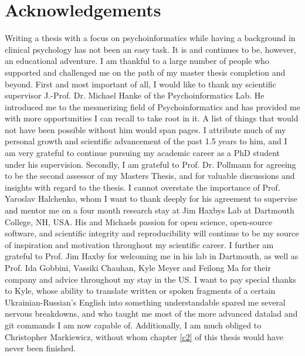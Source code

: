 \documentclass[a4paper, 12pt]{scrreprt}
\begin{document}
\clearpage



\chapter*{Acknowledgements}

	{\scriptsize Writing a thesis with a focus on psychoinformatics while having a background in clinical psychology has not been an easy task. It is and continues to be, however, an educational adventure. I am thankful to a large number of people who supported and challenged me on the path of my master thesis completion and beyond. First and most important of all, I would like to thank my scientific supervisor J.-Prof. Dr. Michael Hanke of the Psychoinformatics Lab. He introduced me to the mesmerizing field of Psychoinformatics and has provided me with more opportunities I can recall to take root in it. A list of things that would not have been possible without him would span pages. I attribute much of my personal growth and scientific advancement of the past 1.5 years to him, and I am very grateful to continue pursuing my academic career as a PhD student under his supervision.
	Secondly, I am grateful to Prof. Dr. Pollmann for agreeing to be the second assessor of my Masters Thesis, and for valuable discussions and insights with regard to the thesis.\newline
	I cannot overstate the importance of Prof. Yaroslav Halchenko, whom I want to thank deeply for his agreement to supervise and mentor me on a four month research stay at Jim Haxbys Lab at Dartmouth College, NH, USA. His and Michaels passion for open science, open-source software, and scientific integrity and reproducibility will continue to be my source of inspiration and motivation throughout my scientific career.
	I further am grateful to Prof. Jim Haxby for welcoming me in his lab in Dartmouth, as well as Prof. Ida Gobbini, Vassiki Chauhan, Kyle Meyer and Feilong Ma for their company and advice throughout my stay in the US. I want to pay special thanks to Kyle, whose ability to translate written or spoken fragments of a certain Ukrainian-Russian's English into something understandable spared me several nervous breakdowns, and who taught me most of the more advanced datalad and git commands I am now capable of. Additionally, I am much obliged to Christopher Markiewicz, without whom chapter \ref{c2} of this thesis would have never been finished. \newline
}
\end{document}
